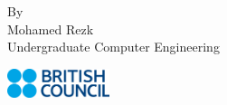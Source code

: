 \documentclass[a4paper, 12pt, twoside,openany]{book}
\begin{document}
\begin{titlepage}
\begin{Large}
\begin{center}
        \vspace{10mm}
        
    \end{center}
    \end{Large}

\begin{minipage}[t]{0.45\textwidth}
\centering
\Large{
By\\
Mohamed Rezk\\
Undergraduate Computer Engineering}
\end{minipage}
\begin{minipage}[t]{0.4\textwidth}
\raggedleft
\Large{}
\end{minipage}

    
    \begin{raggedleft}
        \vspace{40mm}
        \includegraphics[width=3cm]{logo4}
    \end{raggedleft}

\end{titlepage}
\end{document}
